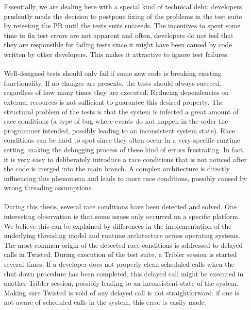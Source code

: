 \noindent Essentially, we are dealing here with a special kind of technical debt: developers prudently made the decision to postpone fixing of the problems in the test suite by retesting the PR until the tests suite succeeds. The incentives to spent some time to fix test errors are not apparent and often, developers do not feel that they are responsible for failing tests since it might have been caused by code written by other developers. This makes it attractive to ignore test failures.\\\\
Well-designed tests should only fail if some new code is breaking existing functionality. If no changes are presents, the tests should always succeed, regardless of how many times they are executed. Reducing dependencies on external resources is not sufficient to guarantee this desired property. The structural problem of the tests is that the system is infected a great amount of race conditions (a type of bug where events do not happen in the order the programmer intended, possibly leading to an inconsistent system state). Race conditions can be hard to spot since they often occur in a very specific runtime setting, making the debugging process of these kind of errors frustrating. In fact, it is very easy to deliberately introduce a race conditions that is not noticed after the code is merged into the main branch. A complex architecture is directly influencing this phenomena and leads to more race conditions, possibly caused by wrong threading assumptions.\\\\
During this thesis, several race conditions have been detected and solved. One interesting observation is that some issues only occurred on a specific platform. We believe this can be explained by differences in the implementation of the underlying threading model and runtime architecture across operating systems. The most common origin of the detected race conditions is addressed to delayed calls in Twisted. During execution of the test suite, a Tribler session is started several times. If a developer does not properly clean scheduled calls when the shut down procedure has been completed, this delayed call might be executed in another Tribler session, possibly leading to an inconsistent state of the system. Making sure Twisted is void of any delayed call is not straightforward: if one is not aware of scheduled calls in the system, this error is easily made.

